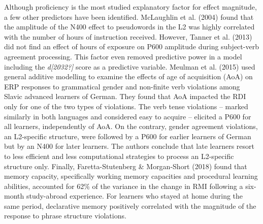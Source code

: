 \documentclass[11pt]{article}
\newenvironment{styleStandard}{\renewcommand\baselinestretch{1.0}\setlength\leftskip{0cm}\setlength\rightskip{0cm plus 1fil}\setlength\parindent{0cm}\setlength\parfillskip{0pt plus 1fil}\setlength\parskip{0in plus 1pt}\writerlistparindent\writerlistleftskip\leavevmode\normalfont\normalsize\writerlistlabel\ignorespaces}{\unskip\vspace{0.111in plus 0.0111in}\par}
\newcommand\writerlistleftskip{}
\newcommand\writerlistparindent{}
\newcommand\writerlistlabel{}
\begin{document}
\begin{styleStandard}
Although proficiency is the most studied explanatory factor for effect magnitude, a few other predictors have been identified. McLaughlin et al. (2004) found that the amplitude of the N400 effect to pseudowords in the L2 was highly correlated with the number of hours of instruction received. However, Tanner et al. (2013) did not find an effect of hours of exposure on P600 amplitude during subject-verb agreement processing. This factor even removed predictive power in a model including the \textit{d[2032?]} score as a predictive variable. Meulman et al. (2015) used general additive modelling to examine the effects of age of acquisition (AoA) on ERP responses to grammatical gender and non-finite verb violations among Slavic advanced learners of German. They found that AoA impacted the RDI only for one of the two types of violations. The verb tense violations – marked similarly in both languages and considered easy to acquire – elicited a P600 for all learners, independently of AoA. On the contrary, gender agreement violations, an L2-specific structure, were followed by a P600 for earlier learners of German but by an N400 for later learners. The authors conclude that late learners resort to less efficient and less computational strategies to process an L2-specific structure only. Finally, Faretta-Stutenberg \& Morgan-Short (2018) found that memory capacity, specifically working memory capacities and procedural learning abilities, accounted for 62\% of the variance in the change in RMI following a six-month study-abroad experience. For learners who stayed at home during the same period, declarative memory positively correlated with the magnitude of the response to phrase structure violations.
\end{styleStandard}
\end{document}
